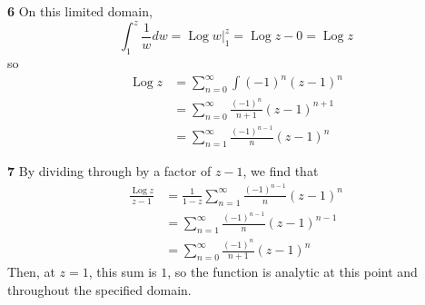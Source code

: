 \documentclass{article}
\DeclareMathOperator{\Log}{Log}
\begin{document}
\textbf{6}
On this limited domain,
\[
	\int_{1}^{z} \frac{1}{w} dw
	= \Log w \Big|_1^z
	= \Log z - 0
	= \Log z
\]
so
\begin{align*}
	\Log z 
	&= \sum_{n=0}^\infty \int (-1)^n (z - 1)^n \\
	&= \sum_{n=0}^\infty \frac{(-1)^n}{n+1} (z - 1)^{n+1} \\
	&= \sum_{n=1}^\infty \frac{(-1)^{n-1}}{n} (z - 1)^n 
\end{align*}

\textbf{7}
By dividing through by a factor of $z - 1$, we find that
\begin{align*}
	\frac{\Log z}{z - 1}
	&= \frac{1}{1 - z} \sum_{n=1}^\infty \frac{(-1)^{n-1}}{n} (z - 1)^n  \\
	&= \sum_{n=1}^\infty \frac{(-1)^{n-1}}{n} (z - 1)^{n-1} \\
	&= \sum_{n=0}^\infty \frac{(-1)^n}{n+1} (z - 1)^n
\end{align*}
Then, at $z = 1$, this sum is $1$, so the function is analytic at this point and throughout the specified domain.
\end{document}
